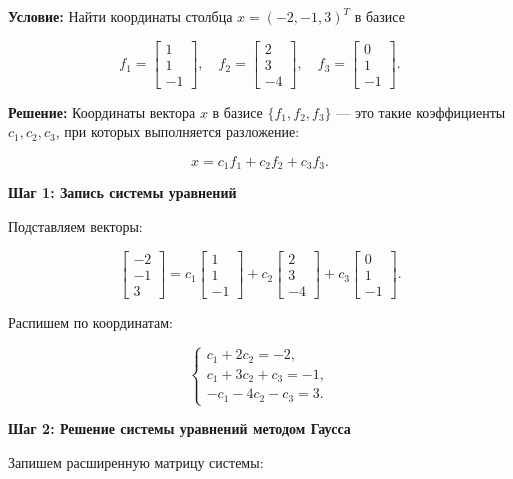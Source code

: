 \textbf{Условие:}  
Найти координаты столбца \( x = (-2, -1, 3)^T \) в базисе  

\[
f_1 = \begin{bmatrix} 1 \\ 1 \\ -1 \end{bmatrix}, \quad
f_2 = \begin{bmatrix} 2 \\ 3 \\ -4 \end{bmatrix}, \quad
f_3 = \begin{bmatrix} 0 \\ 1 \\ -1 \end{bmatrix}.
\]

\textbf{Решение:}  
Координаты вектора \( x \) в базисе \( \{ f_1, f_2, f_3 \} \) — это такие коэффициенты \( c_1, c_2, c_3 \), при которых выполняется разложение:

\[
x = c_1 f_1 + c_2 f_2 + c_3 f_3.
\]

\textbf{Шаг 1: Запись системы уравнений}  

Подставляем векторы:

\[
\begin{bmatrix} -2 \\ -1 \\ 3 \end{bmatrix}
=
c_1 \begin{bmatrix} 1 \\ 1 \\ -1 \end{bmatrix}
+ c_2 \begin{bmatrix} 2 \\ 3 \\ -4 \end{bmatrix}
+ c_3 \begin{bmatrix} 0 \\ 1 \\ -1 \end{bmatrix}.
\]

Распишем по координатам:

\[
\begin{cases}
c_1 + 2c_2 = -2, \\
c_1 + 3c_2 + c_3 = -1, \\
- c_1 - 4c_2 - c_3 = 3.
\end{cases}
\]

\textbf{Шаг 2: Решение системы уравнений методом Гаусса}  

Запишем расширенную матрицу системы:

